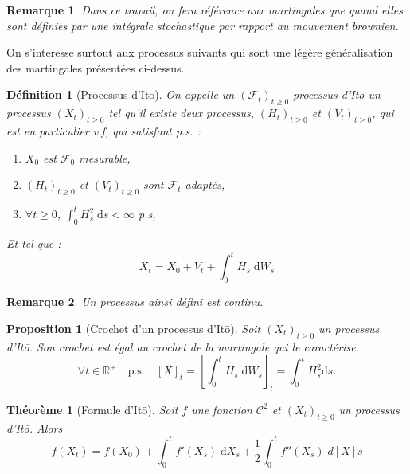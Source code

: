 \documentclass[openany]{book}
\newcommand{\F}{\mathscr{F}}
\newcommand{\R}{\mathbb{R}}
\newcommand{\1}{\mathbbm{1}}
\renewcommand{\d}{\mathrm{d}}
\theoremstyle{thmfont}
\newtheorem{theorem}{Théorème}[chapter]
\theoremstyle{deffont}
\newtheorem{definition}[definition]{Définition}
\theoremstyle{thmfont}
\newtheorem{prop}[prop]{Proposition}
\theoremstyle{deffont}
\newtheorem{remark}[remark]{Remarque}
\begin{document}
\begin{remark}
  Dans ce travail, on fera référence aux martingales que quand elles sont définies par une intégrale stochastique par rapport au mouvement brownien.
\end{remark}


On s'interesse surtout aux processus suivants qui sont une légère généralisation des martingales présentées ci-dessus.
\begin{definition}[Processus d'Itō] On appelle un $(\F_t)_{t\geq0}$ \textit{processus d'Itō} un processus $(X_t)_{t\geq0}$ tel qu'il existe deux processus, $(H_t)_{t\geq0}$ et $(V_t)_{t\geq 0}$, qui est en particulier v.f, qui satisfont p.s. :
  \begin{enumerate}
  \item $X_0$ est $\F_0$ mesurable,
  \item $(H_t)_{t\geq0}$ et $(V_t)_{t\geq0}$ sont $\F_t$ adaptés,
  \item $\forall t \geq 0$, $\int_0^t H_s^2\;\d s < \infty$ p.s,
    \end{enumerate}

    Et tel que :
   $$X_t = X_0 + V_t + \int_0^t H_s \;\d W_s$$
 \end{definition}
 \begin{remark}
   \label{rmk:ContinuitePrIto}
   Un processus ainsi défini est continu.
 \end{remark}
 
 \begin{prop}[Crochet d'un processus d'Itō] Soit $(X_t)_{t\geq0}$ un processus d'Itō. Son crochet est égal au crochet de la martingale qui le caractérise.
   $$\forall t \in  \R^+ \quad\text{p.s.}\quad [X]_t = \left[\int_0^tH_s \;\d W_s\right]_t = \int_0^t H_s^2 \d s.$$
  \end{prop}

  \begin{theorem}[Formule d'Itō]
  Soit $f$ une fonction $\mathcal C^2$ et $(X_t)_{t\geq0}$ un processus d'Itō. Alors
  \begin{equation}
    f(X_t) = f(X_0) + \int_0^t f'(X_s) \;\d X_s + \dfrac{1}{2} \int_0^t f''(X_s) \;d[X]s
  \end{equation}
  \end{theorem}
\end{document}
